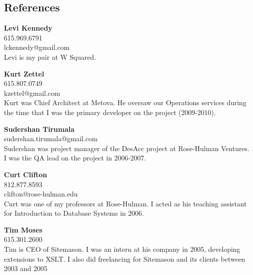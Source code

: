 \documentclass[line, margin, 10pt]{res}
\begin{document}
 

\renewcommand{\namefont}{ \LARGE \bf }

\address{elizabrock@gmail.com}
\address{(858) 205-9285}
 
\begin{resume} 
\section{References}

{\bf Levi Kennedy} \\
615.969.6791\\
lckennedy@gmail.com\\
Levi is my pair at W Squared.

{\bf Kurt Zettel}\\
615.807.0749\\
kzettel@gmail.com\\
Kurt was Chief Architect at Metova.  He oversaw our Operations services during the time that I was the primary developer on the project (2009-2010).

{\bf Sudershan Tirumala}\\
sudershan.tirumala@gmail.com\\
Sudershan was project manager of the DesAcc project at Rose-Hulman Ventures.  I was the QA lead on the project in 2006-2007.

{\bf Curt Clifton}\\
812.877.8593\\
clifton@rose-hulman.edu\\
Curt was one of my professors at Rose-Hulman.  I acted as his teaching assistant for Introduction to Database Systems in 2006.

{\bf Tim Moses}\\
615.301.2600\\
Tim is CEO of Sitemason.  I was an intern at his company in 2005, developing extensions to XSLT.  I also did freelancing for Sitemason and its clients between 2003 and 2005

\end{resume} 
\end{document}
